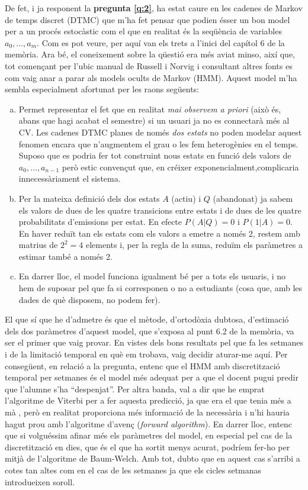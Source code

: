 \documentclass[
	a4paper,
	twoside,
	justified
]{tufte-handout}
\begin{document}
De fet, i ja responent la \textbf{pregunta \ref{q:2}}, ha estat caure en les cadenes de Markov de temps discret (DTMC) que m'ha fet pensar que podien ésser un bon model per a un procés estocàstic com el que en realitat és la seqüència de variables $a_0,\ldots,a_m$. Com es pot veure, per aquí van els trets a l'inici del capítol 6 de la memòria. Ara bé, el coneixement sobre la qüestió era més aviat minso, així que, tot començant per l'ubic manual de Russell i Norvig \citep{russell09} i consultant altres fonts es com vaig anar a parar als models ocults de Markov (HMM). Aquest model m'ha sembla especialment afortunat per les raons següents:

\begin{enumerate}[(a)]
  \item Permet representar el fet que en realitat \emph{mai observem a priori} (això és, abans que hagi acabat el semestre) si un usuari ja no es connectarà més al CV. Les cadenes DTMC planes de només \emph{dos estats} no poden modelar aquest fenomen encara que n'augmentem el grau o les fem heterogènies en el temps. Suposo que es podria fer tot construint nous estats en funció dels valors de $a_0,\ldots,a_{n-1}$ però estic convençut que, en créixer exponencialment,complicaria innecessàriament el sistema.
  \item Per la mateixa definició dels dos estats $A$ (actiu) i $Q$ (abandonat) ja sabem els valors de dues de les quatre transicions entre estats i de dues de les quatre probabilitats d'emissions per estat. En efecte $P(A|Q)=0$ i $P(1|A) = 0$. En haver reduït tan els estats com els valors a emetre a només 2, restem amb matrius de $2^2 = 4$ elements i, per la regla de la suma, reduïm els paràmetres a estimar també a només 2. 
  \item En darrer lloc, el model funciona igualment bé per a tots els usuaris, i no hem de suposar pel que fa si corresponen o no a estudiants (cosa que, amb les dades de què disposem, no podem fer).       
\end{enumerate}

El que sí que he d'admetre és que el mètode, d'ortodòxia dubtosa, d'estimació dels dos paràmetres d'aquest model, que s'exposa al punt 6.2 de la memòria, va ser el primer que vaig provar. En vistes dels bons resultats pel que fa les setmanes i de la limitació temporal en què em trobava, vaig decidir aturar-me aquí. Per consegüent, en relació a la pregunta, entenc que el HMM amb discretització temporal per setmanes és el model més adequat per a que el docent pugui predir que l'alumne s'ha ``despenjat''. Per altra banda, val a dir que he emprat l'algoritme de Viterbi per a fer aquesta predicció, ja que era el que tenia més a mà \citep{himmelmann10},  però en realitat proporciona més informació de la necessària i n'hi hauria hagut prou amb l'algoritme d'avenç (\emph{forward algorithm}). En darrer lloc, entenc que si volguéssim afinar més els paràmetres del model, en especial pel cas de la discretització en dies, que és el que ha sortit menys acurat, podríem fer-ho per mitjà de l'algoritme de Baum-Welch. Amb tot, dubto que en aquest cas s'arribi a cotes tan altes com en el cas de les setmanes ja que els cicles setmanas introdueixen soroll.
\end{document}
